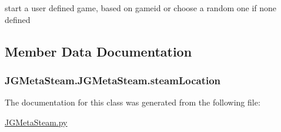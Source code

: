 start a user defined game, based on gameid or choose a random one if none defined 



\subsection{Member Data Documentation}
\hypertarget{class_j_g_meta_steam_1_1_j_g_meta_steam_ad9770696b4a76d5706f5bf5f87a54f4b}{
\subsubsection[{steam\+Location}]{\setlength{\rightskip}{0pt plus 5cm}J\+G\+Meta\+Steam.\+J\+G\+Meta\+Steam.\+steam\+Location}}\label{class_j_g_meta_steam_1_1_j_g_meta_steam_ad9770696b4a76d5706f5bf5f87a54f4b}


The documentation for this class was generated from the following file\+:\begin{DoxyCompactItemize}
\item 
\hyperlink{_j_g_meta_steam_8py}{J\+G\+Meta\+Steam.\+py}\end{DoxyCompactItemize}
